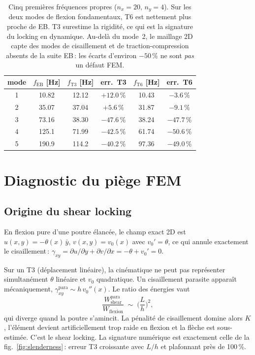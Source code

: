 \documentclass[a4paper,10pt]{article}
\begin{document}
\begin{table}[!ht]
\centering\small
\renewcommand{\arraystretch}{1.15}
\begin{tabular}{cccccc}
\toprule
mode & $f_\text{EB}$ [Hz] & $f_\text{T3}$ [Hz] & err.\ T3 &
                              $f_\text{T6}$ [Hz] & err.\ T6\\
\midrule
1 & 10.82 & 12.12 & $+12.0\,\%$ & 10.43 & $-3.6\,\%$\\
2 & 35.07 & 37.04 & $+5.6\,\%$  & 31.87 & $-9.1\,\%$\\
3 & 73.16 & 38.30 & $-47.6\,\%$ & 38.24 & $-47.7\,\%$\\
4 & 125.1 & 71.99 & $-42.5\,\%$ & 61.74 & $-50.6\,\%$\\
5 & 190.9 & 114.2 & $-40.2\,\%$ & 97.36 & $-49.0\,\%$\\
\bottomrule
\end{tabular}
\caption{Cinq premières fréquences propres ($n_x{=}20,\,n_y{=}4$). Sur
les deux modes de flexion fondamentaux, T6 est nettement plus proche
de EB. T3 surestime la rigidité, ce qui est la signature du locking en
dynamique. Au-delà du mode~2, le maillage 2D capte des modes de
cisaillement et de traction-compression absents de la suite EB\,:
les écarts d'environ $-50\,\%$ ne sont \emph{pas} un défaut FEM.}
\label{tab:modal}
\end{table}

\section{Diagnostic du piège FEM}\label{sec:locking}

\subsection{Origine du shear locking}
En flexion pure d'une poutre élancée, le champ exact 2D est
$u(x,y)=-\theta(x)\,\bar y$, $v(x,y)=v_0(x)$ avec $v_0' = \theta$, ce
qui annule exactement le cisaillement\,:
$\gamma_{xy} = \partial u/\partial y + \partial v/\partial x
= -\theta + v_0' = 0$.

Sur un T3 (déplacement linéaire), la cinématique ne peut pas
représenter simultanément $\theta$ linéaire et $v_0$ quadratique. Un
cisaillement parasite apparaît mécaniquement,
$\gamma_{xy}^\text{para}\sim h\,v_0''(x)$. Le ratio des énergies vaut
\[
\frac{W_\text{shear}^\text{para}}{W_\text{flexion}}
\;\sim\;\Big(\frac{L}{h}\Big)^{2},
\]
qui diverge quand la poutre s'amincit. La pénalité de cisaillement
domine alors $K$, l'élément devient artificiellement trop raide en
flexion et la flèche est sous-estimée. C'est le shear locking. La
signature numérique est exactement celle de la fig.~\ref{fig:slenderness}\,:
erreur T3 croissante avec $L/h$ et plafonnant près de 100\,\%.
\end{document}
